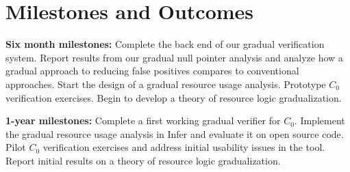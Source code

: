 \documentclass[12pt,twocolumn]{article}
\begin{document}
\begin{sloppypar}
\vspace{-2ex}
\section{Milestones and Outcomes}
\vspace{-2ex}

\textbf{Six month milestones:} Complete the back end of our gradual verification system.  Report results from our gradual null pointer analysis and analyze how a gradual approach to reducing false positives compares to conventional approaches.  Start the design of a gradual resource usage analysis.  Prototype $C_0$ verification exercises.  Begin to develop a theory of resource logic gradualization.

\textbf{1-year milestones:} Complete a first working gradual verifier for $C_0$.  Implement the gradual resource usage analysis in Infer and evaluate it on open source code.  Pilot $C_0$ verification exercises and address initial usability issues in the tool.  Report initial results on a theory of resource logic gradualization.




\end{sloppypar}
\end{document}
